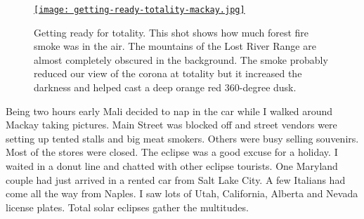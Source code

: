 
\begin{SCfigure}
\centering
\href{https://conceptcontrol.smugmug.com/Places/USA-and-Canada/Idaho-Instants/i-8P2mvsJ/A}{\texttt{[image: getting-ready-totality-mackay.jpg]}}
\caption[Getting ready for totality. This shot shows how much forest fire smoke
was in the air.]{Getting ready for totality. This shot shows how much forest fire smoke
was in the air. The mountains of the Lost River Range are almost
completely obscured in the background. The smoke probably reduced our
view of the corona at totality but it increased the darkness and helped
cast a deep orange red 360-degree dusk.}
\label{fig:5430x2}
\end{SCfigure}
 


Being two hours early Mali decided to nap in the car while I walked
around Mackay taking pictures. Main Street was blocked off and street
vendors were setting up tented stalls and big meat smokers. Others were
busy selling souvenirs. Most of the stores were closed. The eclipse was
a good excuse for a holiday. I waited in a donut line and chatted with
other eclipse tourists. One Maryland couple had just arrived in a rented
car from Salt Lake City. A few Italians had come all the way from
Naples. I saw lots of Utah, California, Alberta and Nevada license
plates. Total solar eclipses gather the multitudes.




